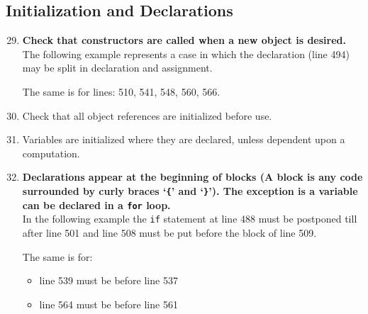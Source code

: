 \documentclass[a4paper,11pt]{report} %
\begin{document}
		\subsection*{Initialization and Declarations}\begin{enumerate}[resume]
			\setcounter{enumi}{28}
			\setcounter{enumi}{29}
			\item \textbf{Check that constructors are called when a new object is desired.}\smallskip \\
				The following example represents a case in which the declaration (line 494) may be split in declaration and assignment.
				
				The same is for lines: 510, 541, 548, 560, 566.
			\item Check that all object references are initialized before use.
			\item Variables are initialized where they are declared, unless dependent upon a computation.
			\item \textbf{Declarations appear at the beginning of blocks (A block is any code surrounded by curly braces `\texttt{\{}' and `\texttt{\}}'). The exception is a variable can be declared in a \texttt{for} loop.} \smallskip \\
				In the following example the \texttt{if} statement at line 488 must be postponed till after line 501 and line 508 must be put before the block of line 509.
				
				The same is for:
				\begin{itemize}
					\item line 539 must be before line 537
					\item line 564 must be before line 561
				\end{itemize}
		\end{enumerate}
		
\end{document}
